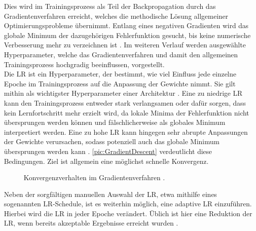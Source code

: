 \noindent
Dies wird im Trainingsprozess als Teil der Backpropagation durch das Gradientenverfahren erreicht, welches die methodische Lösung allgemeiner Optimierungsprobleme übernimmt. Entlang eines negativen Gradienten wird das globale Minimum der dazugehörigen Fehlerfunktion gesucht, bis keine numerische Verbesserung mehr zu verzeichnen ist \cite[S.~428]{ZHA20}. Im weiteren Verlauf werden ausgewählte Hyperparameter, welche das Gradientenverfahren und damit den allgemeinen Trainingsprozess hochgradig beeinflussen, vorgestellt.\\

\noindent
Die \ac{LR} ist ein Hyperparameter, der bestimmt, wie viel Einfluss jede einzelne Epoche im Trainingsprozess auf die Anpassung der Gewichte nimmt. Sie gilt mithin als wichtigster Hyperparameter einer Architektur \cite[S.~428]{ZHA20}. Eine zu niedrige \ac{LR} kann den Trainingsprozess entweder stark verlangsamen oder dafür sorgen, dass kein Lernfortschritt mehr erzielt wird, da lokale Minima der Fehlerfunktion nicht übersprungen werden können und fälschlicherweise als globales Minimum interpretiert werden. Eine zu hohe \ac{LR} kann hingegen sehr abrupte Anpassungen der Gewichte verursachen, sodass potenziell auch das globale Minimum übersprungen werden kann \cite[S.~414-415]{ZHA20}. \autoref{pic:GradientDescent} verdeutlicht diese Bedingungen. Ziel ist allgemein eine möglichst schnelle Konvergenz.\\

\begin{figure}[h!]
  \centering
  \caption{Konvergenzverhalten im Gradientenverfahren \cite[S.~429]{ZHA20}.}
  \label{pic:GradientDescent}
\end{figure}
\newpage

\noindent
Neben der sorgfältigen manuellen Auswahl der \ac{LR}, etwa mithilfe eines sogenannten \ac{LR}-Schedule, ist es weiterhin möglich, eine adaptive \ac{LR} einzuführen. Hierbei wird die \ac{LR} in jeder Epoche verändert. Üblich ist hier eine Reduktion der \ac{LR}, wenn bereits akzeptable Ergebnisse erreicht wurden \cite[S.~433]{ZHA20}.\\

